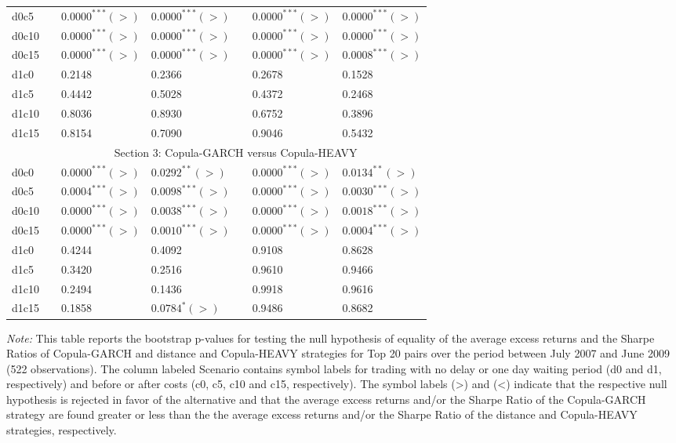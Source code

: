 \documentclass[a4paper,12pt]{report}
\begin{document}
\begin{threeparttable}[H]
\begin{tabularx}{\textwidth}{@{\extracolsep{\fill}}lllllll@{}}
		d0c5 & & $0.0000^{***}(>)$ & $0.0000^{***}(>)$ &       & $0.0000^{***}(>)$ & $0.0000^{***}(>)$   \\
		d0c10 & & $0.0000^{***}(>)$ & $0.0000^{***}(>)$ &       & $0.0000^{***}(>)$ & $0.0000^{***}(>)$ \\
		d0c15 & & $0.0000^{***}(>)$ & $0.0000^{***}(>)$ &       & $0.0000^{***}(>)$ & $0.0008^{***}(>)$ \\
		d1c0 & & 0.2148 & 0.2366  &       & 0.2678 & 0.1528 \\
		d1c5 & & 0.4442 & 0.5028 &       & 0.4372 & 0.2468 \\
		d1c10 & & 0.8036 & 0.8930  &       & 0.6752 & 0.3896 \\
		d1c15 & & 0.8154 & 0.7090 &       & 0.9046 & 0.5432 \\
		\midrule
		& \multicolumn{6}{c}{Section 3: Copula-GARCH versus Copula-HEAVY} \\
		\midrule
		d0c0 & & $0.0000^{***}(>)$ & $0.0292^{**}(>)$ &       & $0.0000^{***}(>)$ & $0.0134^{**}(>)$ \\
		d0c5 & & $0.0004^{***}(>)$ & $0.0098^{***}(>)$ &       & $0.0000^{***}(>)$ & $0.0030^{***}(>)$   \\
		d0c10 & & $0.0000^{***}(>)$ & $0.0038^{***}(>)$ &       & $0.0000^{***}(>)$ & $0.0018^{***}(>)$ \\
		d0c15 & & $0.0000^{***}(>)$ & $0.0010^{***}(>)$ &       & $0.0000^{***}(>)$ & $0.0004^{***}(>)$ \\
		d1c0 & & 0.4244 & 0.4092  &       & 0.9108 & 0.8628 \\
		d1c5 & & 0.3420 & 0.2516 &       & 0.9610 & 0.9466 \\
		d1c10 & & 0.2494 & 0.1436  &       & 0.9918 & 0.9616 \\
		d1c15 & & 0.1858 & $0.0784^{*}(>)$ &       & 0.9486 & 0.8682 \\
		\bottomrule
	\end{tabularx}%
	\begin{tablenotes}
		\item \textit{Note:} \scriptsize This table reports the bootstrap p-values for testing the null hypothesis of equality of the average excess returns and the Sharpe Ratios of Copula-GARCH and distance and Copula-HEAVY strategies for Top 20 pairs over the period between July 2007 and June 2009 (522 observations). The column labeled Scenario contains symbol labels for trading with no delay or one day waiting period (d0 and d1, respectively) and before or after costs (c0, c5, c10 and c15, respectively). The symbol labels (>) and (<) indicate that the respective null hypothesis is rejected in favor of the alternative and that the average excess returns and/or the Sharpe Ratio of the Copula-GARCH strategy are found greater or less than the the average excess returns and/or the Sharpe Ratio of the distance and Copula-HEAVY strategies, respectively.

\end{tablenotes}
\end{threeparttable}
\end{document}
